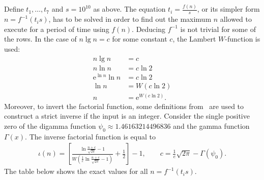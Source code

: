 \documentclass[12pt]{article}
\newcommand{\euler}{\mathrm{e}}
\begin{document}
Define $t_{1}, \dots, t_{7}$ and $s = 10^{10}$ as above. The equation $t_{i} = \frac{f(n)}{s}$, or its simpler form $n = f^{-1}(t_{i} s)$, has to be solved in order to find out the maximum $n$ allowed to execute for a period of time using $f(n)$. Deducing $f^{-1}$ is not trivial for some of the rows. In the case of $n \lg n = c$ for some constant $c$, the Lambert $W$-function is used:
\begin{align*}
  n \lg n &= c \\
  n \ln n &= c \ln 2 \\
  \euler^{\ln n} \ln n &= c \ln 2 \\
  \ln n &= W(c \ln 2) \\
  n &= \euler^{W(c \ln 2)}.
\end{align*}
Moreover, to invert the factorial function, some definitions from~\cite{Cantrell:200110:misc} are used to construct a strict inverse if the input is an integer. Consider the single positive zero of the digamma function $\psi_{0} \approx 1.46163214496836$ and the gamma function $\Gamma(x)$. The inverse factorial function is equal to
\begin{align*}
  \iota(n) = \left[\frac{\ln\frac{n + c}{\sqrt{2 \pi}} - 1}{W(\frac{1}{e}\ln\frac{n + c}{\sqrt{2 \pi}} - 1)} + \frac{1}{2}\right] - 1, \qquad c = \frac{1}{e} \sqrt{2 \pi} - \Gamma(\psi_{0}).
\end{align*}
The table below shows the exact values for all $n = f^{-1}(t_{i} s)$.
\end{document}
